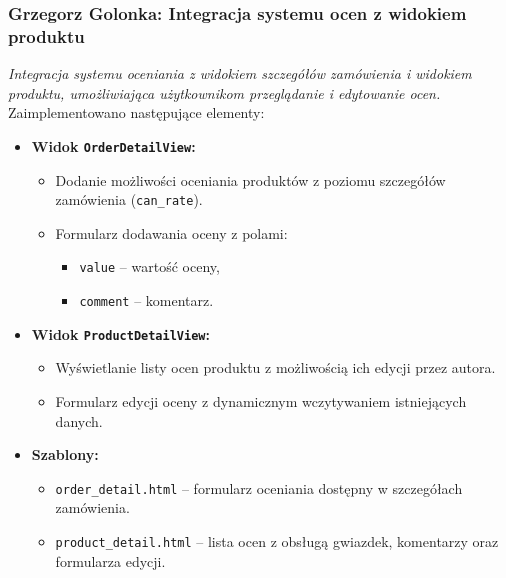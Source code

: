 \documentclass[12pt,a4paper,oneside]{article}
\theoremstyle{definition}
\numberwithin{equation}{section}
\begin{document}
\subsubsection{Grzegorz Golonka: Integracja systemu ocen z widokiem produktu}
\label{section:1.3.33}
\textit{
Integracja systemu oceniania z widokiem szczegółów zamówienia i widokiem produktu, umożliwiająca użytkownikom przeglądanie i edytowanie ocen.
}
Zaimplementowano następujące elementy:
\begin{itemize}
    \item \textbf{Widok \texttt{OrderDetailView}:}
    \begin{itemize}
        \item Dodanie możliwości oceniania produktów z poziomu szczegółów zamówienia (\texttt{can\_rate}).
        \item Formularz dodawania oceny z polami:
        \begin{itemize}
            \item \texttt{value} – wartość oceny,
            \item \texttt{comment} – komentarz.
        \end{itemize}
    \end{itemize}
    \item \textbf{Widok \texttt{ProductDetailView}:}
    \begin{itemize}
        \item Wyświetlanie listy ocen produktu z możliwością ich edycji przez autora.
        \item Formularz edycji oceny z dynamicznym wczytywaniem istniejących danych.
    \end{itemize}
    \item \textbf{Szablony:}
    \begin{itemize}
        \item \texttt{order\_detail.html} – formularz oceniania dostępny w szczegółach zamówienia.
        \item \texttt{product\_detail.html} – lista ocen z obsługą gwiazdek, komentarzy oraz formularza edycji.
    \end{itemize}
\end{itemize}
% 
% 
\end{document}

